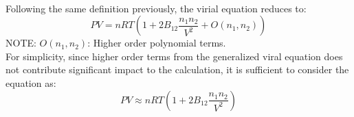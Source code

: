 \documentclass{article}
\begin{document}
\\
Following the same definition previously, the virial equation reduces to:
\[ PV = nRT \left( 1 + 2B_{12} \frac{n_1n_2}{V^2} + O(n_1, n_2) \right) \]
NOTE: $O(n_1, n_2)$: Higher order polynomial terms.
\\
For simplicity, since higher order terms from the generalized viral equation does not contribute significant impact to the calculation, it is 
sufficient to consider the equation as:
\[  PV \approx nRT \left( 1 + 2B_{12} \frac{n_1n_2}{V^2} \right)\]
\end{document}
